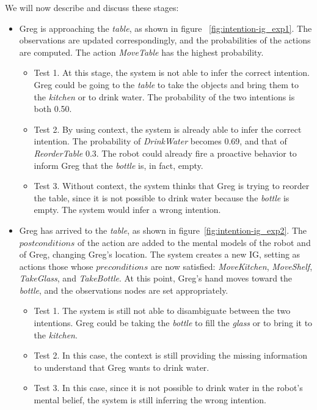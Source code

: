 We will now describe and discuss these stages:
\begin{itemize}
	\item Greg is approaching the \textit{table}, as shown in figure ~\ref{fig:intention-ig_exp1}. The observations are updated correspondingly, and the probabilities of the actions are computed. The action \textit{MoveTable} has the highest probability. 
		\begin{itemize}
			\item Test 1. At this stage, the system is not able to infer the correct intention. Greg could be going to the \textit{table} to take the objects and bring them to the \textit{kitchen} or to drink water. The probability of the two intentions is both 0.50.
			\item Test 2. By using context, the system is already able to infer the correct intention. The probability of \textit{DrinkWater} becomes 0.69, and that of \textit{ReorderTable} 0.3. The robot could already fire a proactive behavior to inform Greg that the \textit{bottle} is, in fact, empty.
			\item Test 3. Without context, the system thinks that Greg is trying to reorder the table, since it is not possible to drink water because the \textit{bottle} is empty. The system would infer a wrong intention.
		\end{itemize}
	\item Greg has arrived to the \textit{table}, as shown in figure~\ref{fig:intention-ig_exp2}. The $postconditions$ of the action are added to the mental models of the robot and of Greg, changing Greg's location. The system creates a new IG, setting as actions those whose $preconditions$ are now satisfied: \textit{MoveKitchen}, \textit{MoveShelf}, \textit{TakeGlass}, and \textit{TakeBottle}. At this point, Greg's hand moves toward the \textit{bottle}, and the observations nodes are set appropriately.
		\begin{itemize}
			\item Test 1. The system is still not able to disambiguate between the two intentions. Greg could be taking the  \textit{bottle} to fill the \textit{glass} or to bring it to the \textit{kitchen}.
			\item Test 2. In this case, the context is still providing the missing information to understand that Greg wants to drink water.
			\item Test 3. In this case, since it is not possible to drink water in the robot's mental belief, the system is still inferring the wrong intention.

\end{itemize}
\end{itemize}
